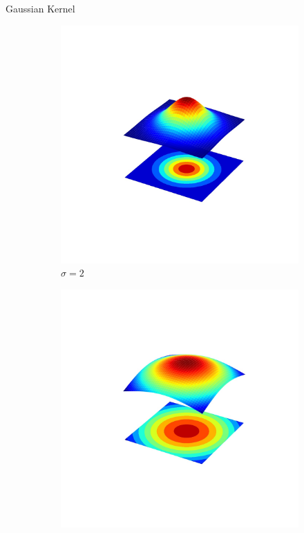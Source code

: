 \begin{frame}{Gaussian Kernel}
\begin{figure}
\begin{subfigure}[b]{0.3\textwidth}
            \includegraphics[width=\textwidth, trim={0 300 0 300},clip]{./figures/gaussian_2d_2.jpg}
            \caption{$\sigma = 2$}
            \label{sfi:gaussian_2d_2}
        \end{subfigure}
        \begin{subfigure}[b]{0.3\textwidth}
            \includegraphics[width=\textwidth, trim={0 300 0 300},clip]{./figures/gaussian_2d_5.jpg}

\end{subfigure}
\end{figure}
\end{frame}
